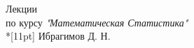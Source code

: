 \begin{titlepage}
\begin{center}

\hspace{0pt}
\vfill
{\LARGE Лекции \\}
{\Large по курсу \textit{"Математическая Статистика"} \\*[11pt]}
{\large Ибрагимов Д. Н.}
\vfill
\hspace{0pt}

\end{center}
\end{titlepage}
\pagebreak
